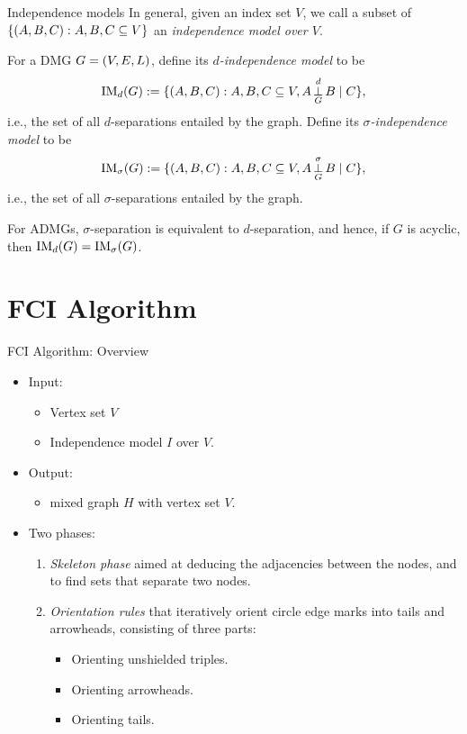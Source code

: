 \begin{frame}{Independence models}
In general, given an index set $V$, we call a subset of 
$\{ \left ( A, B, C \right ) : A, B, C \subseteq V \}$
an \emph{independence model over $V$}.
\begin{Def}[\ref{def:independence_model}]
  For a DMG $G = \left ( V, E, L \right )$, define its \emph{$d$-independence model} to be
  $$\mathrm{IM}_d(G) := \{ \left ( A, B, C \right ) : A, B, C \subseteq V, A \operatorname*{\perp}_G^d B \mid C \},$$
  i.e., the set of all $d$-separations entailed by the graph. Define its
  \emph{$\sigma$-independence model} to be
  $$\mathrm{IM}_\sigma(G) := \{ \left ( A, B, C \right ) : A, B, C \subseteq V, A \operatorname*{\perp}_G^\sigma B \mid C \},$$
  i.e., the set of all $\sigma$-separations entailed by the graph. 
\end{Def}
For ADMGs, $\sigma$-separation is equivalent to $d$-separation, and hence, if $G$ is acyclic, then
$\mathrm{IM}_d(G) = \mathrm{IM}_\sigma(G)$.
\end{frame}

\section{FCI Algorithm}
\frame{\sectionpage}

\begin{frame}{FCI Algorithm: Overview}
  \begin{itemize} 
    \item Input: 
      \begin{itemize}
        \item Vertex set $V$
        \item Independence model $I$ over $V$.
      \end{itemize}
    \item Output: 
      \begin{itemize}
        \item mixed graph $H$ with vertex set $V$.
      \end{itemize}
    \item Two phases:
      \begin{enumerate}
        \item \emph{Skeleton phase} aimed at deducing the adjacencies between the nodes, and to find sets that separate two nodes.
        \item \emph{Orientation rules} that iteratively orient circle edge marks into tails and arrowheads, consisting of three parts:
          \begin{itemize}
        \item Orienting unshielded triples.
        \item Orienting arrowheads.
        \item Orienting tails.
          \end{itemize}
       \end{enumerate}
  \end{itemize}
\end{frame}


